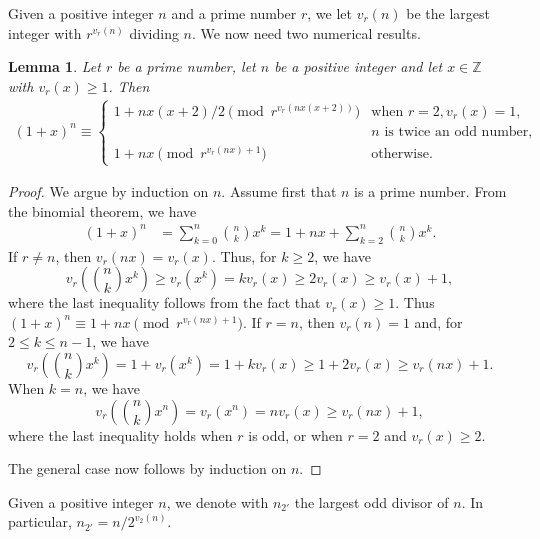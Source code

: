 \documentclass{amsart}
\newtheorem{lemma}[theorem]{Lemma}
\begin{document}
Given a positive integer $n$ and a prime number $r$, we let $v_r(n)$ be the largest integer with $r^{v_r(n)}$ dividing $n$. We now need two numerical results.

\begin{lemma}\label{lemma:mercoledi5}
Let $r$ be a prime number, let $n$ be a positive integer and let $x\in\mathbb{Z}$ with $v_r(x)\ge 1$. Then
\begin{align*}
(1+x)^n\equiv
\begin{cases}
1+nx(x+2)/2\pmod {r^{v_r(nx(x+2))}}&\textrm{when }r=2, v_r(x)=1,\\
&n \textrm{ is twice an odd number},\\
1+nx\pmod{r^{v_r(nx)+1}}&\textrm{otherwise}.
\end{cases}
\end{align*}
\end{lemma}
\begin{proof}
We argue by induction on $n$. Assume first that $n$ is a prime number. From the binomial theorem, we have
\begin{align*}
(1+x)^n &=
\sum_{k=0}^n\binom{n}{k}x^k = 1 + nx + \sum_{k=2}^n\binom{n}{k}x^k.
\end{align*}
If $r\ne n$, then $v_r(nx) = v_r(x)$. Thus, for $k\ge 2$, we have
\[
v_r\left(\binom{n}{k}x^k\right) \ge v_r(x^k) = kv_r(x) \ge 2v_r(x) \ge v_r(x)+1,
\]
where the last inequality follows from the fact that $v_r(x)\ge 1$. Thus $(1+x)^n \equiv 1+nx \pmod{r^{v_r(nx)+1}}$. If $r=n$, then $v_r(n)=1$ and, for $2 \le k \le n-1$, we have
\[
v_r\left(\binom{n}{k}x^k\right) = 1 + v_r(x^k) = 1 + kv_r(x) \ge 1 + 2v_r(x) \ge v_r(nx)+1.
\]
When $k=n$, we have
\[
v_r\left(\binom{n}{k}x^n\right) = v_r(x^n) = nv_r(x) \ge v_r(nx)+1,
\]
where the last inequality holds when $r$ is odd, or when $r=2$ and $v_r(x)\ge 2$.

The general case now follows by induction on $n$.
\end{proof}

Given a positive integer $n$, we denote with $n_{2'}$ the largest odd divisor of $n$.  In particular, $n_{2'}=n/2^{v_2(n)}$.
\end{document}
